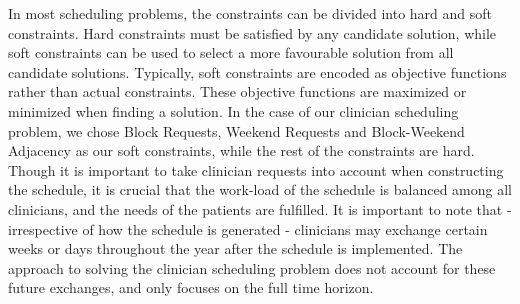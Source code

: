 In most scheduling problems, the constraints can be divided into hard and soft constraints. Hard constraints must be satisfied by any candidate solution, while soft constraints can be used to select a more favourable solution from all candidate solutions. Typically, soft constraints are encoded as objective functions rather than actual constraints. These objective functions are maximized or minimized when finding a solution. In the case of our clinician scheduling problem, we chose Block Requests, Weekend Requests and Block-Weekend Adjacency as our soft constraints, while the rest of the constraints are hard. Though it is important to take clinician requests into account when constructing the schedule, it is crucial that the work-load of the schedule is balanced among all clinicians, and the needs of the patients are fulfilled. It is important to note that - irrespective of how the schedule is generated - clinicians may exchange certain weeks or days throughout the year after the schedule is implemented. The approach to solving the clinician scheduling problem does not account for these future exchanges, and only focuses on the full time horizon.